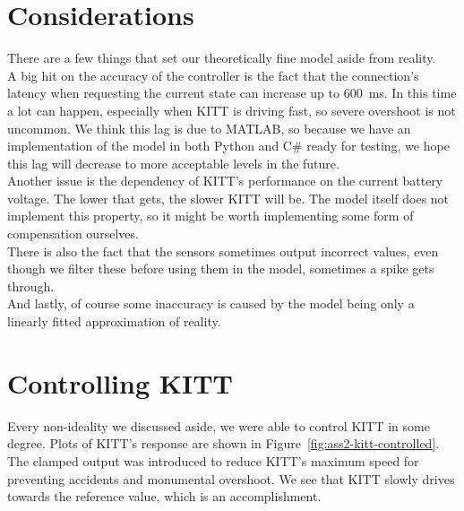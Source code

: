 \documentclass[11pt,titlepage]{report}
\begin{document}
\section{Considerations}
There are a few things that set our theoretically fine model aside from reality. \\
A big hit on the accuracy of the controller is the fact that the connection's latency when requesting the current state can increase up to \SI{600}{ms}. In this time a lot can happen, especially when KITT is driving fast, so severe overshoot is not uncommon. We think this lag is due to MATLAB, so because we have an implementation of the model in both Python and C\# ready for testing, we hope this lag will decrease to more acceptable levels in the future. \\
Another issue is the dependency of KITT's performance on the current battery voltage. The lower that gets, the slower KITT will be. The model itself does not implement this property, so it might be worth implementing some form of compensation ourselves. \\
There is also the fact that the sensors sometimes output incorrect values, even though we filter these before using them in the model, sometimes a spike gets through. \\
And lastly, of course some inaccuracy is caused by the model being only a linearly fitted approximation of reality. \\

\section{Controlling KITT}
Every non-ideality we discussed aside, we were able to control KITT in some degree. Plots of KITT's response are shown in Figure~\ref{fig:ass2-kitt-controlled}. The clamped output was introduced to reduce KITT's maximum speed for preventing accidents and monumental overshoot. We see that KITT slowly drives towards the reference value, which is an accomplishment.
\end{document}

